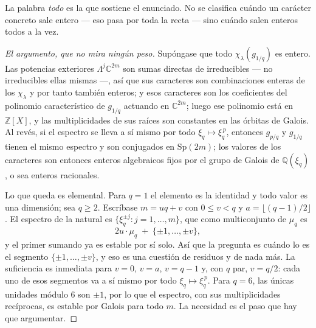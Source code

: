 \documentclass[11pt,a4paper]{article}
\newcommand{\Sp}{\mathrm{Sp}}
\begin{document}
\noindent La palabra \emph{todo} es la que sostiene el enunciado. No se clasifica cuándo un carácter
concreto sale entero --- eso pasa por toda la recta --- sino cuándo salen enteros todos a la vez.

\begin{proof}[El argumento, que no mira ningún peso]
Supóngase que todo $\chi_\lambda(g_{1/q})$ es entero. Las potencias exteriores
$\Lambda^j\mathbb{C}^{2m}$ son sumas directas de irreducibles --- no irreducibles ellas mismas ---,
así que sus caracteres son
combinaciones enteras de los $\chi_\lambda$ y por tanto también enteros; y esos caracteres son los
coeficientes del polinomio característico de $g_{1/q}$ actuando en $\mathbb{C}^{2m}$; luego ese polinomio está en
$\mathbb{Z}[X]$, y las multiplicidades de sus raíces son constantes en las órbitas de Galois. Al
revés, si el espectro se lleva a sí mismo por todo $\xi_q\mapsto\xi_q^{\,p}$, entonces $g_{p/q}$ y
$g_{1/q}$ tienen el mismo espectro y son conjugados en $\Sp(2m)$; los valores de los caracteres son
entonces enteros algebraicos fijos por el grupo de Galois de $\mathbb{Q}(\xi_q)$, o sea enteros
racionales.

Lo que queda es elemental. Para $q=1$ el elemento es la identidad y todo valor es una dimensión; sea $q\ge2$. Escríbase $m=uq+v$ con $0\le v<q$ y $a=\lfloor(q-1)/2\rfloor$. El
espectro de la natural es $\{\xi_q^{\pm j}: j=1,\dots,m\}$, que como multiconjunto de $\mu_q$ es
\[
2u\cdot\mu_q \;+\;\{\pm1,\dots,\pm v\} ,
\]
y el primer sumando ya es estable por sí solo. Así que la pregunta es cuándo lo es el segmento
$\{\pm1,\dots,\pm v\}$, y eso es una cuestión de residuos y de nada más. La suficiencia es
inmediata para $v=0$, $v=a$, $v=q-1$ y, con $q$ par, $v=q/2$: cada uno de esos segmentos va a sí
mismo por todo $\xi_q\mapsto\xi_q^{\,p}$. Para $q=6$, las únicas unidades módulo $6$ son $\pm1$, por lo que el espectro, con sus multiplicidades recíprocas, es estable por Galois para todo $m$. La necesidad es el paso que hay que argumentar.


\end{proof}
\end{document}
